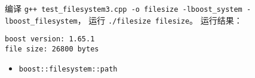 编译 \verb|g++ test_filesystem3.cpp -o filesize -lboost_system -lboost_filesystem|， 运行 \verb|./filesize filesize|。 运行结果：
\begin{lstlisting}[language=none]
boost version: 1.65.1
file size: 26800 bytes
\end{lstlisting}

\begin{itemize}
\item \verb|boost::filesystem::path|
\end{itemize}
